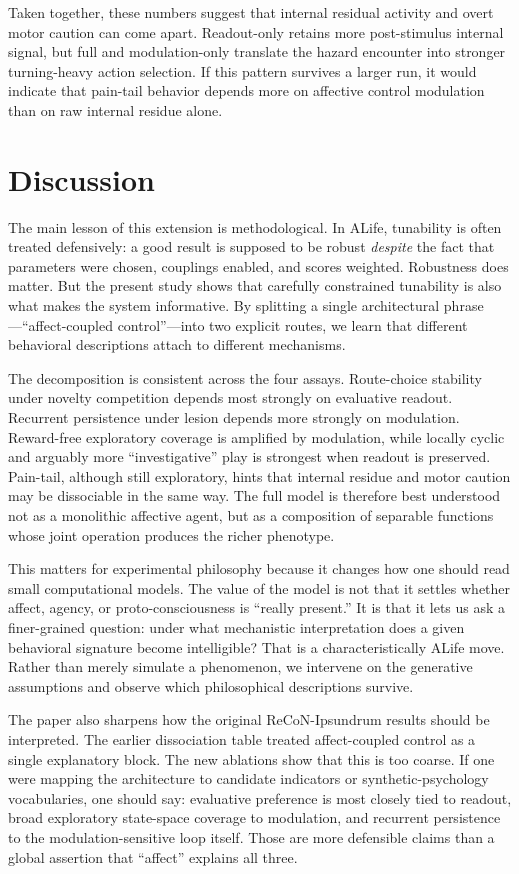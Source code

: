 \documentclass[letterpaper]{article}
\begin{document}
Taken together, these numbers suggest that internal residual activity and overt motor caution can come apart. Readout-only retains more post-stimulus internal signal, but full and modulation-only translate the hazard encounter into stronger turning-heavy action selection. If this pattern survives a larger run, it would indicate that pain-tail behavior depends more on affective control modulation than on raw internal residue alone.

\section{Discussion}
The main lesson of this extension is methodological. In ALife, tunability is often treated defensively: a good result is supposed to be robust \emph{despite} the fact that parameters were chosen, couplings enabled, and scores weighted. Robustness does matter. But the present study shows that carefully constrained tunability is also what makes the system informative. By splitting a single architectural phrase---``affect-coupled control''---into two explicit routes, we learn that different behavioral descriptions attach to different mechanisms.

The decomposition is consistent across the four assays. Route-choice stability under novelty competition depends most strongly on evaluative readout. Recurrent persistence under lesion depends more strongly on modulation. Reward-free exploratory coverage is amplified by modulation, while locally cyclic and arguably more ``investigative'' play is strongest when readout is preserved. Pain-tail, although still exploratory, hints that internal residue and motor caution may be dissociable in the same way. The full model is therefore best understood not as a monolithic affective agent, but as a composition of separable functions whose joint operation produces the richer phenotype.

This matters for experimental philosophy because it changes how one should read small computational models. The value of the model is not that it settles whether affect, agency, or proto-consciousness is ``really present.'' It is that it lets us ask a finer-grained question: under what mechanistic interpretation does a given behavioral signature become intelligible? That is a characteristically ALife move. Rather than merely simulate a phenomenon, we intervene on the generative assumptions and observe which philosophical descriptions survive.

The paper also sharpens how the original ReCoN-Ipsundrum results should be interpreted. The earlier dissociation table treated affect-coupled control as a single explanatory block. The new ablations show that this is too coarse. If one were mapping the architecture to candidate indicators or synthetic-psychology vocabularies, one should say: evaluative preference is most closely tied to readout, broad exploratory state-space coverage to modulation, and recurrent persistence to the modulation-sensitive loop itself. Those are more defensible claims than a global assertion that ``affect'' explains all three.
\end{document}
